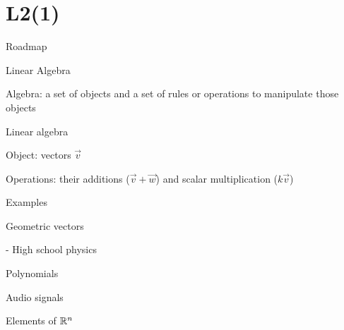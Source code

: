 \documentclass[handout,fleqn,aspectratio=169]{beamer}
\begin{document}
\section{L2(1)}
\begin{frame}{Roadmap}

\plitemsep 0.1in

\bce[(1)] 
\item {}

\item {}
\ece
\end{frame}


\begin{frame}{Linear Algebra}

\plitemsep 0.1in

\bci 
\item Algebra: a set of objects and a set of rules or operations to manipulate those objects

\item Linear algebra
\plitemsep 0.05in
\bci
\item Object: vectors $\vec{v}$
\item Operations: their additions ($\vec{v} + \vec{w}$) and scalar multiplication ($k\vec{v}$)
\eci

\item Examples

{
\bci
\item Geometric vectors

- High school physics
\item Polynomials
\item Audio signals
\item Elements of ${\mathbb R}^n$
\eci
}
{
\centering
{}
}

\eci
\end{frame}
\end{document}
